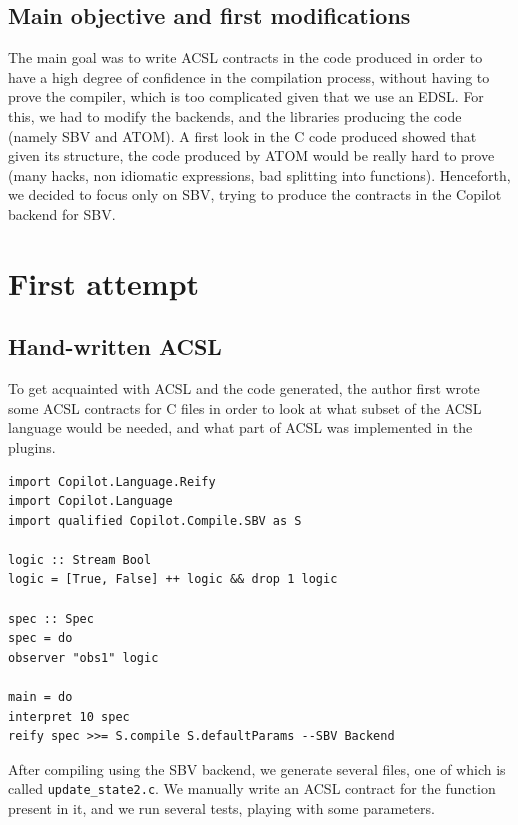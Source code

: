 \documentclass[a4paper,11pt,final]{article}
\begin{document}
	\subsection{Main objective and first modifications}
	The main goal was to write ACSL contracts in the code produced in order to have a high degree of confidence in the compilation process, without having to prove the compiler, which is too complicated given that we use an EDSL. For this, we had to modify the backends, and the libraries producing the code (namely SBV and ATOM). A first look in the C code produced showed that given its structure, the code produced by ATOM would be really hard to prove (many hacks, non idiomatic expressions, bad splitting into functions). Henceforth, we decided to focus only on SBV, trying to produce the contracts in the Copilot backend for SBV.
	
	\section{First attempt}
	\subsection{Hand-written ACSL}
	
	To get acquainted with ACSL and the code generated, the author first wrote some ACSL contracts for C files in order to look at what subset of the ACSL language would be needed, and what part of ACSL was implemented in the plugins.
	
\begin{verbatim}
import Copilot.Language.Reify
import Copilot.Language
import qualified Copilot.Compile.SBV as S

logic :: Stream Bool
logic = [True, False] ++ logic && drop 1 logic

spec :: Spec
spec = do
observer "obs1" logic

main = do
interpret 10 spec
reify spec >>= S.compile S.defaultParams --SBV Backend

\end{verbatim}
	
	After compiling using the SBV backend, we generate several files, one of which is called \texttt{update\_state2.c}. We manually write an ACSL contract for the function present in it, and we run several tests, playing with some parameters.
	
\end{document}
